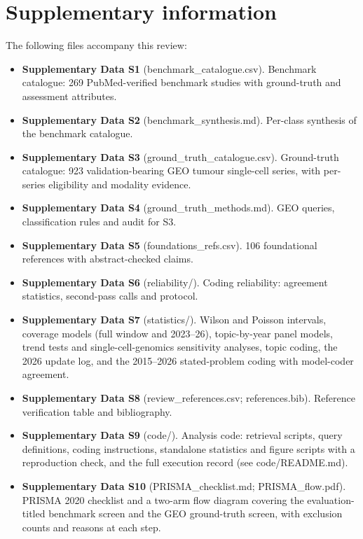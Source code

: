 \documentclass{article}
\begin{document}
\section{Supplementary information}\label{supplementary-information}

The following files accompany this review:

\begin{itemize}
\tightlist
\item
  \textbf{Supplementary Data S1} (benchmark\_catalogue.csv). Benchmark
  catalogue: 269 PubMed-verified benchmark studies with ground-truth and
  assessment attributes.
\item
  \textbf{Supplementary Data S2} (benchmark\_synthesis.md). Per-class
  synthesis of the benchmark catalogue.
\item
  \textbf{Supplementary Data S3} (ground\_truth\_catalogue.csv).
  Ground-truth catalogue: 923 validation-bearing GEO tumour single-cell
  series, with per-series eligibility and modality evidence.
\item
  \textbf{Supplementary Data S4} (ground\_truth\_methods.md). GEO
  queries, classification rules and audit for S3.
\item
  \textbf{Supplementary Data S5} (foundations\_refs.csv). 106
  foundational references with abstract-checked claims.
\item
  \textbf{Supplementary Data S6} (reliability/). Coding reliability:
  agreement statistics, second-pass calls and protocol.
\item
  \textbf{Supplementary Data S7} (statistics/). Wilson and Poisson
  intervals, coverage models (full window and 2023--26), topic-by-year
  panel models, trend tests and single-cell-genomics sensitivity
  analyses, topic coding, the 2026 update log, and the 2015--2026
  stated-problem coding with model-coder agreement.
\item
  \textbf{Supplementary Data S8} (review\_references.csv;
  references.bib). Reference verification table and bibliography.
\item
  \textbf{Supplementary Data S9} (code/). Analysis code: retrieval
  scripts, query definitions, coding instructions, standalone statistics
  and figure scripts with a reproduction check, and the full execution
  record (see code/README.md).
\item
  \textbf{Supplementary Data S10} (PRISMA\_checklist.md;
  PRISMA\_flow.pdf). PRISMA 2020 checklist and a two-arm flow diagram
  covering the evaluation-titled benchmark screen and the GEO
  ground-truth screen, with exclusion counts and reasons at each step.
\end{itemize}
\end{document}
